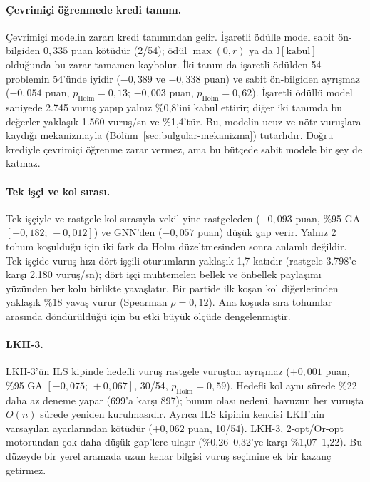\paragraph{Çevrimiçi öğrenmede kredi tanımı.}
Çevrimiçi modelin zararı kredi tanımından gelir. İşaretli ödülle model sabit ön-bilgiden $0{,}335$
puan kötüdür (2/54); ödül $\max(0,r)$ ya da $\mathbb{I}[\text{kabul}]$ olduğunda bu zarar tamamen
kaybolur. İki tanım da işaretli ödülden 54 problemin 54'ünde iyidir ($-0{,}389$ ve $-0{,}338$ puan) ve
sabit ön-bilgiden ayrışmaz ($-0{,}054$ puan, $p_{\mathrm{Holm}}=0{,}13$; $-0{,}003$ puan,
$p_{\mathrm{Holm}}=0{,}62$). İşaretli ödüllü model saniyede 2.745 vuruş yapıp yalnız \%0,8'ini kabul
ettirir; diğer iki tanımda bu değerler yaklaşık 1.560 vuruş/sn ve \%1,4'tür. Bu, modelin ucuz ve
nötr vuruşlara kaydığı mekanizmayla (Bölüm~\ref{sec:bulgular-mekanizma}) tutarlıdır. Doğru krediyle
çevrimiçi öğrenme zarar vermez, ama bu bütçede sabit modele bir şey de katmaz.

\paragraph{Tek işçi ve kol sırası.}
Tek işçiyle ve rastgele kol sırasıyla vekil yine rastgeleden ($-0{,}093$ puan, \%95 GA
$[-0{,}182;\,-0{,}012]$) ve GNN'den ($-0{,}057$ puan) düşük gap verir. Yalnız 2 tohum koşulduğu için iki
fark da Holm düzeltmesinden sonra anlamlı değildir. Tek işçide vuruş hızı dört işçili oturumların
yaklaşık 1,7 katıdır (rastgele 3.798'e karşı 2.180 vuruş/sn); dört işçi muhtemelen bellek ve
önbellek paylaşımı yüzünden her kolu birlikte yavaşlatır. Bir partide ilk koşan kol diğerlerinden yaklaşık
\%18 yavaş vurur (Spearman $\rho=0{,}12$). Ana koşuda sıra tohumlar arasında döndürüldüğü için bu
etki büyük ölçüde dengelenmiştir.

\paragraph{LKH-3.}
LKH-3'ün ILS kipinde hedefli vuruş rastgele vuruştan ayrışmaz ($+0{,}001$ puan, \%95 GA
$[-0{,}075;\,+0{,}067]$, 30/54, $p_{\mathrm{Holm}}=0{,}59$). Hedefli kol aynı sürede \%22 daha az deneme
yapar (699'a karşı 897); bunun olası nedeni, havuzun her vuruşta $O(n)$ sürede yeniden kurulmasıdır. Ayrıca ILS kipinin
kendisi LKH'nin varsayılan ayarlarından kötüdür ($+0{,}062$ puan, 10/54). LKH-3, 2-opt/Or-opt
motorundan çok daha düşük gap'lere ulaşır (\%0,26--0,32'ye karşı \%1,07--1,22). Bu düzeyde bir
yerel aramada uzun kenar bilgisi vuruş seçimine ek bir kazanç getirmez.

